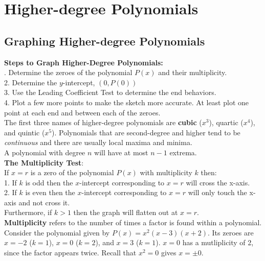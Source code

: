 \documentclass{article}
\begin{document}
    \section{Higher-degree Polynomials}

    \subsection{Graphing Higher-degree Polynomials}
    \color{purple} \textbf{Steps to Graph Higher-Degree Polynomials:} \color{black} \\

    . Determine the zeroes of the polynomial $P(x)$ and their multiplicity. \\
    2. Determine the $y$-intercept, $(0, P(0))$ \\
    3. Use the Leading Coefficient Test to determine the end behaviors. \\
    4. Plot a few more points to make the sketch more accurate.
    At least plot one point at each end and between each of the zeroes. \\

    \noindent The first three names of higher-degree polynomials are \textbf{cubic} ($x^3$),
    quartic ($x^4$), and quintic ($x^5$). Polynomials that are second-degree and higher
    tend to be \textit{continuous} and there are usually local maxima and minima. \\

    \noindent A polynomial with degree $n$ will have at most $n-1$ extrema. \\

    \noindent \color{purple} \textbf{The Multiplicity Test}: \\

    \noindent \color{black}
    If $x=r$ is a zero of the polynomial $P(x)$ with multiplicity $k$ then:  \\
    1. If $k$ is odd then the $x$-intercept corresponding to $x=r$ will cross the x-axis. \\
    2. If $k$ is even then the $x$-intercept corresponding to $x=r$ will only touch the
    x-axis and not cross it. \\

    \noindent Furthermore, if $k>1$ then the graph will flatten out at $x=r$. \\

    \noindent \color{purple} \textbf{Multiplicity} \color{black} refers to the number of
    times a factor is found within a polynomial. Consider the polynomial given by
    $P(x)=x^2(x-3)(x+2)$. Its zeroes are $x=-2$ ($k=1$), $x=0$ ($k=2$), and
    $x=3$ ($k=1$). $x=0$ has a mutliplicity of 2, since the factor appears twice.
    Recall that $x^2=0$ gives $x=\pm 0$. \\
\end{document}
